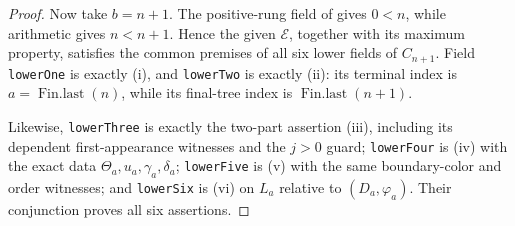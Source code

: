 \begin{proof}
Now take \(b=n+1\).  The positive-rung field of
 gives \(0<n\), while arithmetic gives
\(n<n+1\).  Hence the given \(\mathcal E\), together with its maximum
property, satisfies the common premises of all six lower fields of
\(C_{n+1}\).  Field \texttt{lowerOne} is exactly (i), and
\texttt{lowerTwo} is exactly (ii): its terminal index is
\(a=\operatorname{Fin.last}(n)\), while its final-tree index is
\(\operatorname{Fin.last}(n+1)\).

Likewise, \texttt{lowerThree} is exactly the two-part assertion (iii),
including its dependent first-appearance witnesses and the \(j>0\) guard;
\texttt{lowerFour} is (iv) with the exact data
\(\Theta_a,u_a,\gamma_a,\delta_a\); \texttt{lowerFive} is (v) with the
same boundary-color and order witnesses; and \texttt{lowerSix} is (vi)
on \(L_a\) relative to \((D_a,\varphi_a)\).  Their conjunction proves all
six assertions.
\end{proof}
